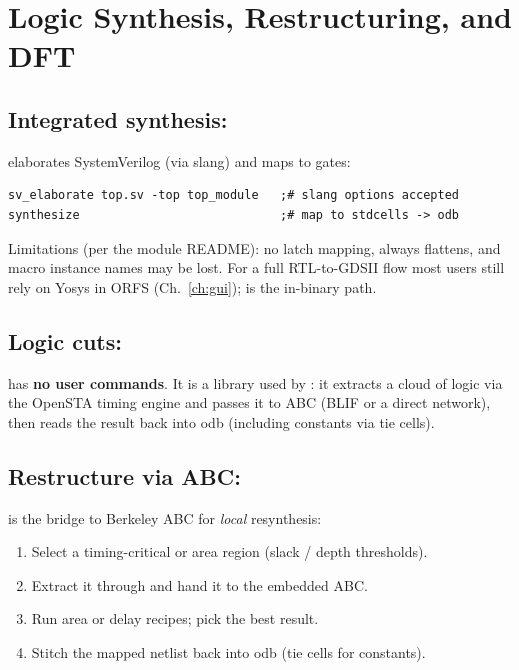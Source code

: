 \chapter{Logic Synthesis, Restructuring, and DFT}
\label{ch:logic}


\section{Integrated synthesis: }

 elaborates SystemVerilog (via slang) and maps to gates:

\begin{lstlisting}[style=ortcl]
sv_elaborate top.sv -top top_module   ;# slang options accepted
synthesize                            ;# map to stdcells -> odb
\end{lstlisting}

Limitations (per the module README): no latch mapping, always flattens, and
macro instance names may be lost. For a full RTL-to-GDSII flow most users
still rely on Yosys in ORFS (Ch.~\ref{ch:gui});  is the in-binary
path.

\section{Logic cuts: }

 has \textbf{no user commands}. It is a library used by
: it extracts a cloud of logic via the OpenSTA timing engine and
passes it to ABC (BLIF or a direct network), then reads the result back into
odb (including constants via tie cells).

\section{Restructure via ABC: }

 is the bridge to Berkeley ABC for \emph{local}
resynthesis:

\begin{enumerate}
  \item Select a timing-critical or area region (slack / depth thresholds).
  \item Extract it through  and hand it to the embedded ABC.
  \item Run area or delay recipes; pick the best result.
  \item Stitch the mapped netlist back into odb (tie cells for constants).
\end{enumerate}

